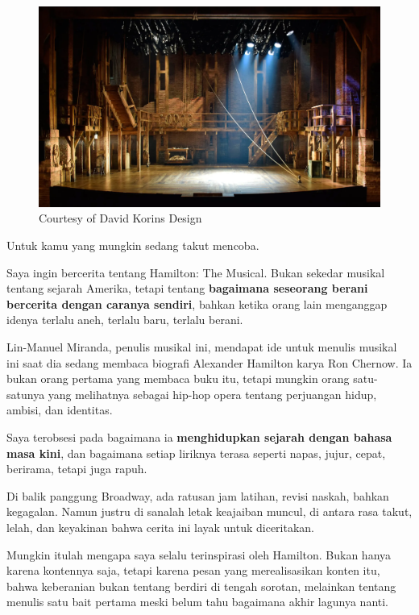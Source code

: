 \documentclass[
  letterpaper,
  DIV=11,
  numbers=noendperiod]{scrreprt}
\begin{document}
\begin{figure}[H]

{\centering \includegraphics[width=0.95\linewidth,height=\textheight,keepaspectratio]{My_Stories_for_You/../images/hamiltonSet.jpg}

}

\caption{Courtesy of David Korins Design}

\end{figure}%

Untuk kamu yang mungkin sedang takut mencoba.

Saya ingin bercerita tentang Hamilton: The Musical. Bukan sekedar
musikal tentang sejarah Amerika, tetapi tentang \textbf{bagaimana
seseorang berani bercerita dengan caranya sendiri}, bahkan ketika orang
lain menganggap idenya terlalu aneh, terlalu baru, terlalu berani.

Lin-Manuel Miranda, penulis musikal ini, mendapat ide untuk menulis
musikal ini saat dia sedang membaca biografi Alexander Hamilton karya
Ron Chernow. Ia bukan orang pertama yang membaca buku itu, tetapi
mungkin orang satu-satunya yang melihatnya sebagai hip-hop opera tentang
perjuangan hidup, ambisi, dan identitas.

Saya terobsesi pada bagaimana ia \textbf{menghidupkan sejarah dengan
bahasa masa kini}, dan bagaimana setiap liriknya terasa seperti napas,
jujur, cepat, berirama, tetapi juga rapuh.

Di balik panggung Broadway, ada ratusan jam latihan, revisi naskah,
bahkan kegagalan. Namun justru di sanalah letak keajaiban muncul, di
antara rasa takut, lelah, dan keyakinan bahwa cerita ini layak untuk
diceritakan.

Mungkin itulah mengapa saya selalu terinspirasi oleh Hamilton. Bukan
hanya karena kontennya saja, tetapi karena pesan yang merealisasikan
konten itu, bahwa keberanian bukan tentang berdiri di tengah sorotan,
melainkan tentang menulis satu bait pertama meski belum tahu bagaimana
akhir lagunya nanti.
\end{document}
